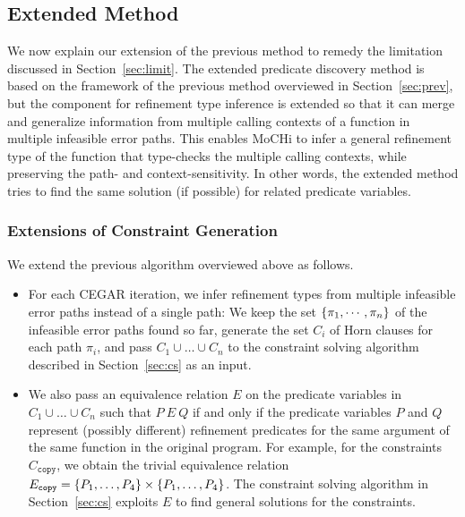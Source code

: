 \subsection{Extended Method}
\label{sec:ext}

We now explain our extension of the previous method to remedy the 
limitation discussed in Section~\ref{sec:limit}.  The extended predicate 
discovery method is based on the framework of the previous method 
overviewed in Section~\ref{sec:prev}, but the component for refinement 
type inference is extended so that it can merge and generalize 
information from multiple calling contexts of a function in multiple 
infeasible error paths.  This enables MoCHi to infer a general 
refinement type of the function that type-checks the multiple calling 
contexts, while preserving the path- and context-sensitivity.  In other 
words, the extended method tries to find the same solution (if possible) 
for related predicate variables.

\subsubsection{Extensions of Constraint Generation}
\label{sec:extcg}


We extend the previous algorithm overviewed above as follows.
\begin{itemize}
\item For each CEGAR iteration, we infer refinement types from multiple
infeasible error paths instead of a single path:  We keep the set
\(\{{\pi_1,\cdots,\pi_n}\}\) of the infeasible error paths found so far,
generate the set \(C_i\) of Horn clauses for each path \(\pi_i\), and
pass \(C_1 \cup \dots \cup C_n\) to the constraint solving algorithm
described in Section~\ref{sec:cs} as an input.  %
\item We also pass an equivalence relation \(E\) on the predicate
variables in \(C_1 \cup \dots \cup C_n\) such that \(P\ E\ Q\) if and
only if the predicate variables \(P\) and \(Q\) represent (possibly
different) refinement predicates for the same argument of the same
function in the original program.  For example, for the constraints
\(C_{\texttt{copy}}\), we obtain the trivial equivalence relation
\(E_{\texttt{copy}}=\{{P_1,\dots,P_4}\} \times \{{P_1,\dots,P_4}\}\).
The constraint solving algorithm in Section~\ref{sec:cs} exploits \(E\)
to find general solutions for the constraints.
\end{itemize}

